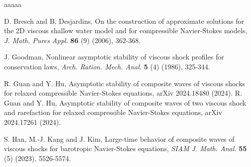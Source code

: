 \documentclass[10pt,reqno]{amsart}
\numberwithin{equation}{section}
\begin{document}
\begin{thebibliography}{aaaaa}

 D. Bresch and B. Desjardins, On the construction of approximate solutions for the 2D viscous shallow water model and for compressible Navier-Stokes models, {\it J. Math. Pures Appl.} {\bf 86 }(9) (2006), 362-368.







 J. Goodman, Nonlinear asymptotic stability of viscous shock profiles for conservation laws, {\it Arch. Ration. Mech. Anal. }{\bf 5} (4) (1986), 325-344.

 {R. Guan and Y. Hu, Asymptotic stability of composite waves of viscous shocks for relaxed compressible Navier-Stokes equations, arXiv 2024.18480 (2024).}
 {R. Guan and Y. Hu, Asymptotic stability of composite waves of two viscous shock and rarefaction  for relaxed compressible Navier-Stokes equations, arXiv 2024.17261 (2024).}

 S. Han, M.-J. Kang and J. Kim, Large-time behavior of composite waves of viscous shocks for barotropic Navier-Stokes equations, {\it SIAM J. Math. Anal.} {\bf  55} (5) (2023), 5526-5574.


\end{thebibliography}
\end{document}
